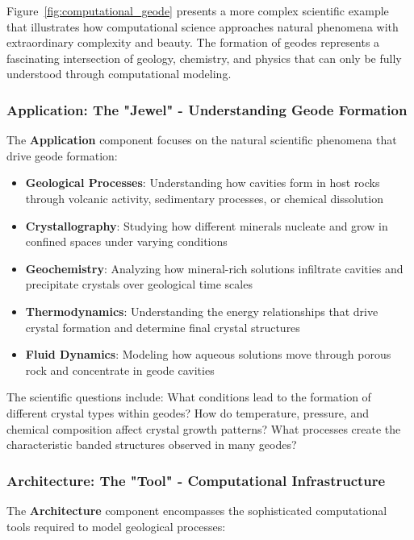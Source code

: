 Figure~\ref{fig:computational_geode} presents a more complex scientific example that illustrates how computational science approaches natural phenomena with extraordinary complexity and beauty. The formation of geodes represents a fascinating intersection of geology, chemistry, and physics that can only be fully understood through computational modeling.

\subsubsection{Application: The "Jewel" - Understanding Geode Formation}

The \textbf{Application} component focuses on the natural scientific phenomena that drive geode formation:

\begin{itemize}
    \item \textbf{Geological Processes}: Understanding how cavities form in host rocks through volcanic activity, sedimentary processes, or chemical dissolution
    \item \textbf{Crystallography}: Studying how different minerals nucleate and grow in confined spaces under varying conditions
    \item \textbf{Geochemistry}: Analyzing how mineral-rich solutions infiltrate cavities and precipitate crystals over geological time scales
    \item \textbf{Thermodynamics}: Understanding the energy relationships that drive crystal formation and determine final crystal structures
    \item \textbf{Fluid Dynamics}: Modeling how aqueous solutions move through porous rock and concentrate in geode cavities
\end{itemize}

The scientific questions include: What conditions lead to the formation of different crystal types within geodes? How do temperature, pressure, and chemical composition affect crystal growth patterns? What processes create the characteristic banded structures observed in many geodes?

\subsubsection{Architecture: The "Tool" - Computational Infrastructure}

The \textbf{Architecture} component encompasses the sophisticated computational tools required to model geological processes:

